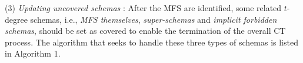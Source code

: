 \documentclass{sig-alternate}
\begin{document}
%

(3) \emph{Updating uncovered schemas} :
After the MFS are identified, some related $t$-degree schemas, i.e., \emph{MFS themselves}, \emph{super-schemas} and \emph{implicit forbidden schemas}, should be set as covered to enable the termination of the overall CT process. The algorithm that seeks to handle these three types of schemas is listed in Algorithm 1.
\end{document}
